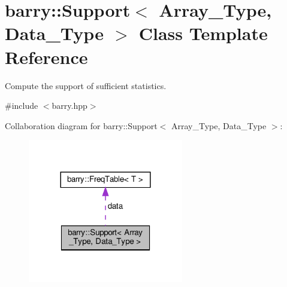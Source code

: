 \hypertarget{classbarry_1_1_support}{}\section{barry\+:\+:Support$<$ Array\+\_\+\+Type, Data\+\_\+\+Type $>$ Class Template Reference}
\label{classbarry_1_1_support}


Compute the support of sufficient statistics.  




{\ttfamily \#include $<$barry.\+hpp$>$}



Collaboration diagram for barry\+:\+:Support$<$ Array\+\_\+\+Type, Data\+\_\+\+Type $>$\+:
\nopagebreak
\begin{figure}[H]
\begin{center}
\leavevmode
\includegraphics[width=192pt]{classbarry_1_1_support__coll__graph}
\end{center}
\end{figure}
